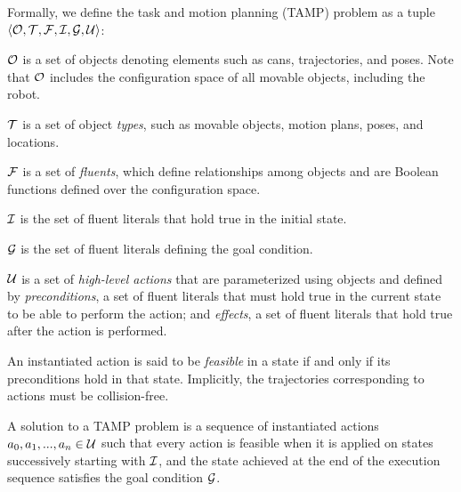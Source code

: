 \begin{defn}
Formally, we define the task and motion planning (TAMP) problem as a tuple $\langle \mathcal{O},
 \mathcal{T}, \mathcal{F}, \mathcal{I}, \mathcal{G}, \mathcal{U} \rangle$:
\begin{tightlist}
\item $\mathcal{O}$ is a set of objects denoting elements such as cans,
  trajectories, and poses. Note that $\mathcal{O}$ includes the
  configuration space of all movable objects, including the robot.
\item $\mathcal{T}$ is a set of object \emph{types}, such as movable objects, motion plans, poses, and locations.
\item $\mathcal{F}$ is a set of \emph{fluents}, which define relationships
  among objects and are Boolean functions defined over the configuration space.
\item $\mathcal{I}$ is the set of fluent literals that hold true in the initial state.
\item $\mathcal{G}$ is the set of fluent literals defining the goal condition.
\item $\mathcal{U}$ is a set of \emph{high-level actions} that are
  parameterized using objects and defined by \emph{preconditions}, a set
of fluent literals that must hold true in the current state to be able to perform the action;
and \emph{effects}, a set of fluent literals that hold true after the
action is performed. 
\end{tightlist}
\end{defn}

An instantiated action is said to be \emph{feasible} in a state if and only if its
preconditions hold in that state. Implicitly, the trajectories corresponding to actions
must be collision-free.

A solution to a TAMP problem is a sequence of instantiated
actions $a_{0}, a_{1}, ..., a_{n} \in \mathcal{U}$ such that every action is
feasible when it is applied on states successively starting with $\mathcal{I}$, and the
state achieved at the end of the execution sequence satisfies the
goal condition $\mathcal{G}$.



